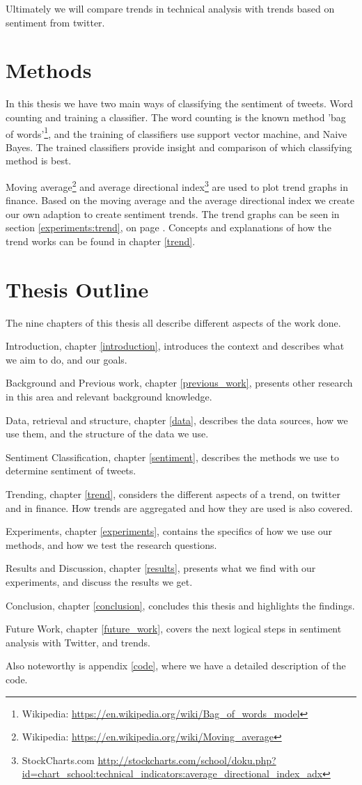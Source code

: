 Ultimately we will compare trends in technical analysis with trends based on
sentiment from twitter. 

\section{Methods}

In this thesis we have two main ways of classifying the sentiment of tweets.
Word counting and training a classifier. The word counting is the known method
'bag of words'\footnote{Wikipedia: \url{https://en.wikipedia.org/wiki/Bag_of_words_model}},
and the training of classifiers use support vector machine, and Naive Bayes.
The trained classifiers provide insight and comparison of which classifying
method is best.  

Moving average\footnote{Wikipedia:
\url{https://en.wikipedia.org/wiki/Moving_average}} and average directional
index\footnote{StockCharts.com
\url{http://stockcharts.com/school/doku.php?id=chart_school:technical_indicators:average_directional_index_adx}}
are used to plot trend graphs in finance.
Based on the moving average and the average directional index we create our own
adaption to create sentiment trends.  
The trend graphs can be seen in section
\ref{experiments:trend}, on page \pageref{experiments:trend}. Concepts and
explanations of how the trend works can be found in chapter \ref{trend}.

\section{Thesis Outline}
The nine chapters of this thesis all describe different aspects of the work
done.
 
Introduction, chapter \ref{introduction}, introduces the context and describes
what we aim to do, and our goals. 

Background and Previous work, chapter \ref{previous_work}, presents other
research in this area and relevant background knowledge. 

Data, retrieval and structure, chapter \ref{data}, describes the data sources,
how we use them, and the structure of the data we use. 

Sentiment Classification, chapter \ref{sentiment}, describes the methods we use
to determine sentiment of tweets.  

Trending, chapter \ref{trend}, considers the different aspects of a trend, on
twitter and in finance. How trends are aggregated and how they are used is also
covered.  

Experiments, chapter \ref{experiments}, contains the specifics of how we use
our methods, and how we test the research questions.

Results and Discussion, chapter \ref{results}, presents what we find with our
experiments, and discuss the results we get.   

Conclusion, chapter \ref{conclusion}, concludes this thesis and highlights the
findings.  

Future Work, chapter \ref{future_work}, covers the next logical steps in
sentiment analysis with Twitter, and trends.  

Also noteworthy is appendix \ref{code}, where we have a detailed description of
the code.
%
